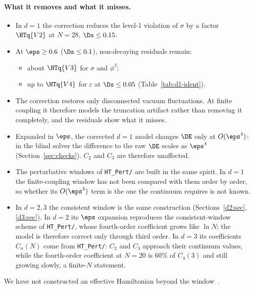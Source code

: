 \paragraph{What it removes and what it misses.}
\begin{itemize}
\item In $d=1$ the correction reduces the level-1 violation of $\sigma$ by a factor $\HTq{V2}$ at $N=28$,
 $\Ds\le0.15$.
\item At $\eps\ge0.6$ ($\Ds\le0.1$), non-decaying residuals remain:
 \begin{itemize}
 \item about $\HTq{V3}$ for $\sigma$ and $\phi^3$;
 \item up to $\HTq{V4}$ for $\varepsilon$ at $\Ds\le0.05$ (Table~\ref{tab:d1-ident}).
 \end{itemize}
\item The correction restores only disconnected vacuum fluctuations. At finite coupling it therefore models the
 truncation artifact rather than removing it completely, and the residuals show what it misses.
\item Expanded in $\eps$, the corrected $d=1$ model changes $\DE$ only at $O(\eps^4)$: in the blind solver the
 difference to the raw $\DE$ scales as $\eps^{4}$ (Section~\ref{sec:checks}). $C_2$ and $C_3$ are therefore unaffected.
\item The perturbative windows of \texttt{HT\_Pert/} are built in the same spirit. In $d=1$ the finite-coupling
 window has not been compared with them order by order, so whether its $O(\eps^4)$ term is the one the continuum
 requires is not known.
\item In $d=2,3$ the consistent window is the same construction (Sections~\ref{d2:sec}, \ref{d3:sec}). In $d=2$ its
 $\eps$ expansion reproduces the consistent-window scheme of \texttt{HT\_Pert/}, whose fourth-order coefficient
 grows like $\ln N$; the model is therefore correct only through third order. In $d=3$ its coefficients $C_n(N)$
 come from \texttt{HT\_Pert/}: $C_2$ and $C_3$ approach their continuum values, while the fourth-order coefficient at
 $N=20$ is 60\% of $C_4(3)$ and still growing slowly, a finite-$N$ statement.
\end{itemize}
We have not constructed an effective Hamiltonian beyond the window~\cite{Cohen:2021erm,EliasMiro:2022pua}.
